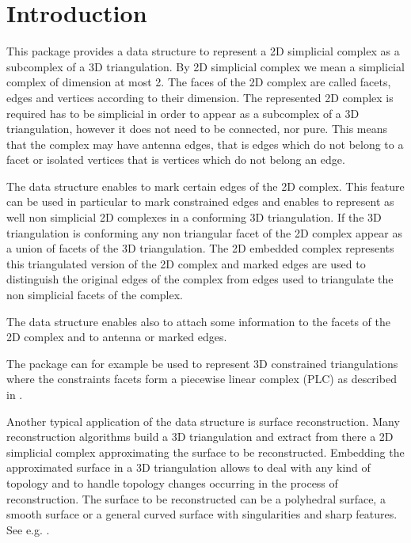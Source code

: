 	
\label{chapter_Complex2inTriangulation3}
\label{chapter_C2inT3}


\vspace*{-15mm}
\minitoc
\vspace*{30mm}

\section{Introduction}
\label{section_C2inT3_Intro}
This package provides a data structure to  represent a
2D simplicial complex as a subcomplex of a 3D triangulation.
By 2D simplicial complex we mean a simplicial complex of dimension at
most 2. The faces of the 2D complex are called
facets, edges and vertices according to their dimension.
The represented 2D complex is required has to be simplicial 
in order to appear 
as a subcomplex of a 3D triangulation, however 
it does not need to be connected, nor pure.
This   means that the complex may have antenna edges, that is 
edges which do not belong to a facet  or 
isolated vertices that is vertices which do not belong an edge.

The data structure enables to mark certain edges of the 2D complex.
This feature can be used in particular
to mark constrained edges and enables 
to represent as well non simplicial 2D complexes 
in a conforming 3D triangulation.
If the 3D triangulation is conforming any non triangular facet
of the 2D complex appear as a union of facets of the 3D triangulation.
The 2D embedded complex represents this triangulated version of the
2D complex and marked edges are used to distinguish  the original
edges  of the complex from edges used to triangulate
the non simplicial facets of the complex.

The data structure enables also to attach some information to the
facets of the 2D complex and to antenna or marked edges.

The package can for example be used to represent 3D constrained
triangulations where the constraints facets form a piecewise linear
complex (PLC) as described in \cite{s-cgehd-98}.

Another typical application of the data structure is surface
reconstruction. Many reconstruction algorithms
build a 3D triangulation and extract from there
a 2D simplicial complex approximating the surface to be reconstructed.
Embedding the approximated surface in a 3D
triangulation allows to deal with any kind of topology and to handle
topology changes occurring in the process of reconstruction.
The surface to be reconstructed can be 
a polyhedral surface, a smooth surface or a general curved surface
with singularities and sharp features. See e.g. \cite{prisme-bo-03}.

